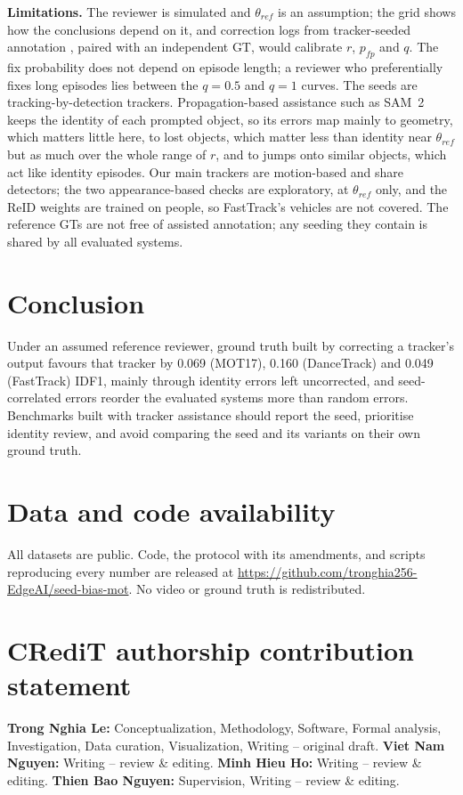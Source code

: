 \documentclass[final,times,twocolumn]{elsarticle}
\begin{document}
\textbf{Limitations.} The reviewer is simulated and $\theta_{ref}$ is an assumption; the grid shows how the
conclusions depend on it, and correction logs from tracker-seeded annotation \cite{nae2026indoorcrowd},
paired with an independent GT, would calibrate $r$, $p_{fp}$ and $q$. The fix probability does not depend
on episode length; a reviewer who preferentially fixes long episodes lies between the $q = 0.5$ and $q = 1$
curves. The seeds are tracking-by-detection trackers. Propagation-based assistance such as SAM~2 \cite{ravi2024sam2}
keeps the identity of each prompted object, so its errors map mainly to geometry, which matters little here,
to lost objects, which matter less than identity near $\theta_{ref}$ but as much over the whole range of $r$,
and to jumps onto similar objects, which act like identity episodes. Our main trackers are
motion-based and share detectors; the two appearance-based checks are exploratory, at $\theta_{ref}$ only, and
the ReID weights are trained on people, so FastTrack's vehicles are not covered. The reference GTs are
not free of assisted annotation; any seeding they contain is shared by all evaluated systems.

\section{Conclusion}

Under an assumed reference reviewer, ground truth built by correcting a tracker's output favours that
tracker by 0.069 (MOT17), 0.160 (DanceTrack) and 0.049 (FastTrack) IDF1, mainly through identity errors left
uncorrected, and seed-correlated errors reorder the evaluated systems more than random errors. Benchmarks
built with tracker assistance should report the seed, prioritise identity review, and avoid comparing the
seed and its variants on their own ground truth.

\section*{Data and code availability}
All datasets are public. Code, the protocol with its amendments, and scripts reproducing every number are
released at \url{https://github.com/tronghia256-EdgeAI/seed-bias-mot}. No video or ground truth is redistributed.

\section*{CRediT authorship contribution statement}
\textbf{Trong Nghia Le:} Conceptualization, Methodology, Software, Formal analysis, Investigation, Data
curation, Visualization, Writing -- original draft. \textbf{Viet Nam Nguyen:} Writing -- review \& editing.
\textbf{Minh Hieu Ho:} Writing -- review \& editing. \textbf{Thien Bao Nguyen:} Supervision, Writing --
review \& editing.
\end{document}

